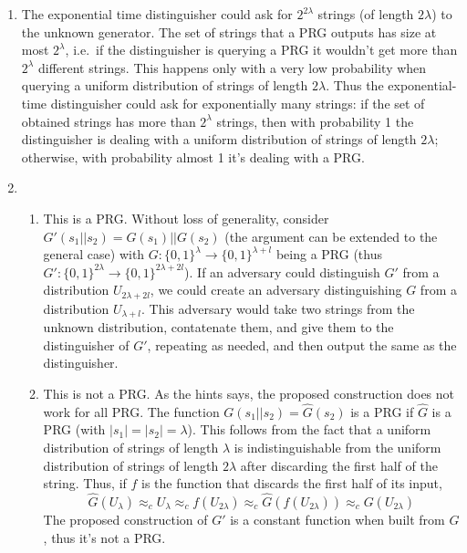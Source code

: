 \documentclass{article}
\newcommand{\compind}{\approx_c}
\newcommand{\abs}[1]{\left| {#1} \right|}
\begin{document}
\begin{enumerate}
	\item The exponential time distinguisher could ask for $2^{2\lambda}$ strings (of length $2\lambda$) to the unknown generator.
		The set of strings that a PRG outputs has size at most $2^{\lambda}$, i.e.\ if the distinguisher is querying a PRG it wouldn't get more than $2^{\lambda}$ different strings.
		This happens only with a very low probability when querying a uniform distribution of strings of length $2\lambda$.
		Thus the exponential-time distinguisher could ask for exponentially many strings: if the set of obtained strings has more than $2^{\lambda}$ strings, then with probability 1 the distinguisher is dealing with a uniform distribution of strings of length $2\lambda$; otherwise, with probability almost 1 it's dealing with a PRG.

	\item
		\begin{enumerate}
			\item This is a PRG.
				Without loss of generality, consider $G'(s_1 || s_2) = G(s_1) || G(s_2)$ (the argument can be extended to the general case) with $G : \{0,1\}^{\lambda} \to \{0,1\}^{\lambda + l}$ being a PRG (thus $G' : \{0,1\}^{2\lambda} \to \{0,1\}^{2\lambda + 2l}$).
				If an adversary could distinguish $G'$ from a distribution $U_{2\lambda + 2l}$, we could create an adversary distinguishing $G$ from a distribution $U_{\lambda + l}$.
				This adversary would take two strings from the unknown distribution, contatenate them, and give them to the distinguisher of $G'$, repeating as needed, and then output the same as the distinguisher.
			\item This is not a PRG.
				As the hints says, the proposed construction does not work for all PRG.
				The function $G(s_1 || s_2) = \hat{G}(s_2)$ is a PRG if $\hat{G}$ is a PRG (with $\abs{s_1} = \abs{s_2} = \lambda$).
				This follows from the fact that a uniform distribution of strings of length $\lambda$ is indistinguishable from the uniform distribution of strings of length $2\lambda$ after discarding the first half of the string.
				Thus, if $f$ is the function that discards the first half of its input,
				\[
					\hat{G}(U_{\lambda}) \compind U_{\lambda} \compind f(U_{2\lambda}) \compind \hat{G}(f(U_{2\lambda})) \compind G(U_{2\lambda})
				\]
				The proposed construction of $G'$ is a constant function when built from $G$, thus it's not a PRG.
		\end{enumerate}
\end{enumerate}
\end{document}

